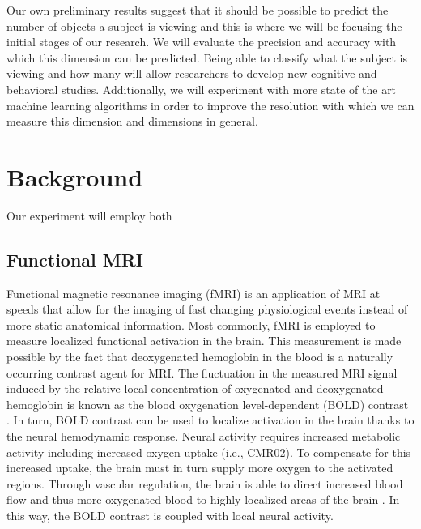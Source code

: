 \documentclass[12pt]{article}
\begin{document}
Our own preliminary results suggest that it should be possible to predict the number of objects a subject is viewing and this is where we will be focusing the initial stages of our research.
We will evaluate the precision and accuracy with which this dimension can be predicted.
Being able to classify what the subject is viewing and how many will allow researchers to develop new cognitive and behavioral studies. 
Additionally, we will experiment with more state of the art machine learning algorithms in order to improve the resolution with which we can measure this dimension and dimensions in general.

\section{Background}
Our experiment will employ both 

\subsection{Functional MRI}
Functional magnetic resonance imaging (fMRI) is an application of MRI at speeds that allow for the imaging of fast changing physiological events instead of more static anatomical information.
Most commonly, fMRI is employed to measure localized functional activation in the brain.
This measurement is made possible by the fact that deoxygenated hemoglobin in the blood is a naturally occurring contrast agent for MRI.
The fluctuation in the measured MRI signal induced by the relative local concentration of oxygenated and deoxygenated hemoglobin is known as the blood oxygenation level-dependent (BOLD) contrast \cite{Ogawa1990}.
In turn, BOLD contrast can be used to localize activation in the brain thanks to the neural hemodynamic response.
Neural activity requires increased metabolic activity including increased oxygen uptake (i.e., CMR02).
To compensate for this increased uptake, the brain must in turn supply more oxygen to the activated regions.
Through vascular regulation, the brain is able to direct increased blood flow and thus more oxygenated blood to highly localized areas of the brain \cite{Buxton2004}.
In this way, the BOLD contrast is coupled with local neural activity.
\end{document}
